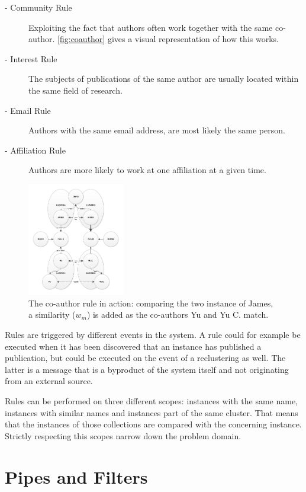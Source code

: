 \documentclass[9pt, twocolumn]{phdsymp} %
\begin{document}
\begin{description}
	\item[- Community Rule] Exploiting the fact that authors often work together with the same co-author. \autoref{fig:coauthor} gives a visual representation of how this works.
	\item[- Interest Rule] The subjects of publications of the same author are usually located within the same field of research.
	\item[- Email Rule] Authors with the same email address, are most likely the same person.
	\item[- Affiliation Rule] Authors are more likely to work at one affiliation at a given time.
\end{description}

\begin{figure}[ht!]
	\centering
	\includegraphics[width= 0.38\textwidth]{fig/coauthorrulenameeq.pdf}
	\caption{The co-author rule in action: comparing the two instance of James, a similarity ($w_m$) is added as the co-authors Yu and Yu C. match.}
	\label{fig:pipes}
\end{figure}

Rules are triggered by different events in the system. A rule could for example be executed when it has been discovered that an instance has published a publication, but could be executed on the event of a reclustering as well. The latter is a message that is a byproduct of the system itself and not originating from an external source.

Rules can be performed on three different scopes: instances with the same name, instances with similar names and instances part of the same cluster. That means that the instances of those collections are compared with the concerning instance. Strictly respecting this scopes narrow down the problem domain.

\section{Pipes and Filters}
\label{pipes}
\end{document}
